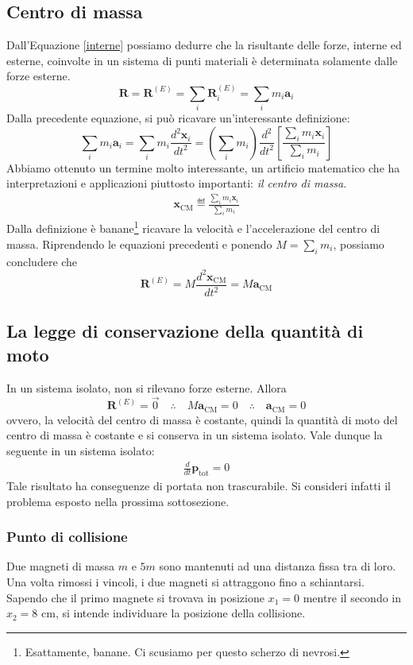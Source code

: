 \subsection{Centro di massa}
Dall'Equazione \ref{interne} possiamo dedurre che la risultante delle
forze, interne ed esterne, coinvolte in un sistema di punti materiali
è determinata solamente dalle forze esterne.
\[ \mathbf{R} = \mathbf{R}^{(E)} = \sum_{i} \mathbf{R}^{(E)}_i = \sum_i m_i\mathbf{a}_i \]
Dalla precedente equazione, si può ricavare un'interessante definizione:
\[ \sum_i m_i\mathbf{a}_i = \sum_i m_i \frac{d^2\mathbf{x}_i}{dt^2} = \left(\sum_i m_i\right) \frac{d^2}{dt^2}\left[ \frac{\sum_i m_i\mathbf{x}_i}{\sum_i m_i} \right] \]
Abbiamo ottenuto un termine molto interessante, un artificio matematico
che ha interpretazioni e applicazioni piuttosto importanti: \textit{il
centro di massa}.
\begin{align}
    \mathbf{x}_\text{CM} \eqdef \frac{\sum_i m_i\mathbf{x}_i}{\sum_i m_i}
\end{align}
Dalla definizione è banane\footnote{Esattamente, banane. Ci scusiamo per questo scherzo di nevrosi.} ricavare la velocità e l'accelerazione del
centro di massa. Riprendendo le equazioni precedenti e ponendo $M = \sum_i m_i$,
possiamo concludere che
\[ \mathbf{R}^{(E)} = M\frac{d^2\mathbf{x}_\text{CM}}{dt^2} = M\mathbf{a}_\text{CM} \]

\subsection{La legge di conservazione della quantità di moto}
In un sistema isolato, non si rilevano forze esterne. Allora
\[ \mathbf{R}^{(E)} = \overrightarrow{0} \quad \therefore \quad M\mathbf{a}_\text{CM} = 0 \quad \therefore \quad \mathbf{a}_\text{CM} = 0 \]
ovvero, la velocità del centro di massa è costante, quindi la
quantità di moto del centro di massa è costante e si conserva in
un sistema isolato. Vale dunque la seguente in un sistema isolato:
\begin{align}
    \frac{d}{dt}\mathbf{p}_\text{tot} = 0
\end{align}
Tale risultato ha conseguenze di portata non trascurabile. Si consideri
infatti il problema esposto nella prossima sottosezione.

\subsubsection*{Punto di collisione}
Due magneti di massa $m$ e $5m$ sono mantenuti ad una distanza fissa tra
di loro. Una volta rimossi i vincoli, i due magneti si attraggono fino a
schiantarsi. Sapendo che il primo magnete si trovava in posizione $x_1 = 0$
mentre il secondo in $x_2 = 8\text{ cm}$, si intende individuare la posizione
della collisione.

